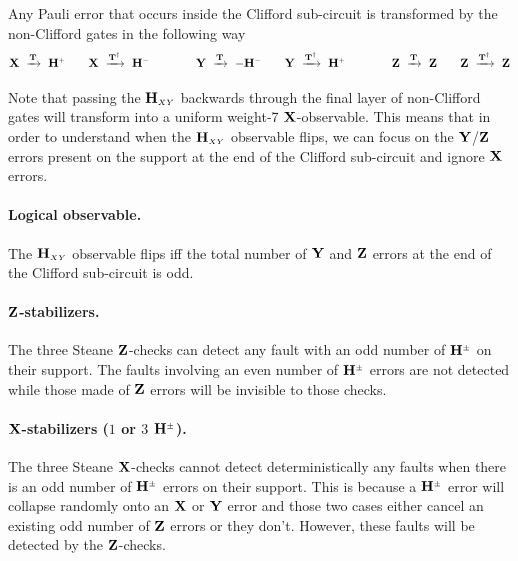 \documentclass{article}
\newcommand{\Sup}[1]{^{\scriptscriptstyle #1}}
\newcommand{\sub}[1]{_{\scriptscriptstyle #1}}
\newcommand{\Op}[1]{{\bf #1}}
\begin{document}
	Any Pauli error that occurs inside the Clifford sub-circuit is transformed by the non-Clifford gates in the following way
	\vspace{-0.25cm}
	\begin{equation*}
		\Op{X} ~\xrightarrow{\Op{T}}~ \Op{H}\Sup{+}
		\qquad
		\Op{X} ~\xrightarrow{\Op{T}\Sup{\dagger}}~ \Op{H}\Sup{-}
		\qquad\qquad
		\Op{Y} ~\xrightarrow{\Op{T}}~ -\Op{H}\Sup{-}
		\qquad
		\Op{Y} ~\xrightarrow{\Op{T}\Sup{\dagger}}~ \Op{H}\Sup{+}
		\qquad\qquad
		\Op{Z} ~\xrightarrow{\Op{T}}~ \Op{Z}
		\qquad
		\Op{Z} ~\xrightarrow{\Op{T}\Sup{\dagger}}~ \Op{Z}
	\end{equation*}

	Note that passing the $\Op{H}\sub{XY}$ backwards through the final layer of non-Clifford gates will transform into a uniform weight-7 $\Op{X}$-observable. This means that in order to understand when the $\Op{H}\sub{XY}$ observable flips, we can focus on the $\Op{Y}$/$\Op{Z}$ errors present on the support at the end of the Clifford sub-circuit and ignore $\Op{X}$ errors.

	\paragraph{Logical observable.} The $\Op{H}\sub{XY}$ observable flips iff the total number of $\Op{Y}$ and $\Op{Z}$ errors at the end of the Clifford sub-circuit is odd.

	\paragraph{$\Op{Z}$-stabilizers.} The three Steane $\Op{Z}$-checks can detect any fault with an odd number of $\Op{H}\Sup{\pm}$ on their support. The faults involving an even number of $\Op{H}\Sup{\pm}$ errors are not detected while those made of $\Op{Z}$ errors will be invisible to those checks.

	\paragraph{$\Op{X}$-stabilizers ($1$ or $3$ $\Op{H}\Sup{\pm}$).} The three Steane $\Op{X}$-checks cannot detect deterministically any faults when there is an odd number of $\Op{H}\Sup{\pm}$ errors on their support. This is because a $\Op{H}\Sup{\pm}$ error will collapse randomly onto an $\Op{X}$ or $\Op{Y}$ error and those two cases either cancel an existing odd number of $\Op{Z}$ errors or they don't. However, these faults will be detected by the $\Op{Z}$-checks.
\end{document}
